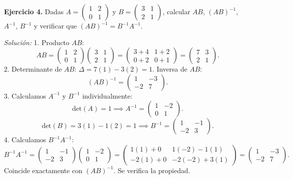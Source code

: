 \documentclass[11pt,letterpaper]{article}
\theoremstyle{definition}
\theoremstyle{plain}
\begin{document}
\vspace{0.3cm}
\textbf{Ejercicio 4.} Dadas $A = \begin{pmatrix} 1 & 2 \\ 0 & 1 \end{pmatrix}$ y $B = \begin{pmatrix} 3 & 1 \\ 2 & 1 \end{pmatrix}$, calcular $AB$, $(AB)^{-1}$, $A^{-1}$, $B^{-1}$ y verificar que $(AB)^{-1} = B^{-1} A^{-1}$.

\emph{Solución:}
1. Producto $AB$:
\[
AB = \begin{pmatrix} 1 & 2 \\ 0 & 1 \end{pmatrix} \begin{pmatrix} 3 & 1 \\ 2 & 1 \end{pmatrix} = \begin{pmatrix} 3+4 & 1+2 \\ 0+2 & 0+1 \end{pmatrix} = \begin{pmatrix} 7 & 3 \\ 2 & 1 \end{pmatrix}.
\]
2. Determinante de $AB$: $\Delta = 7(1) - 3(2) = 1$. Inversa de $AB$:
\[
(AB)^{-1} = \begin{pmatrix} 1 & -3 \\ -2 & 7 \end{pmatrix}.
\]
3. Calculamos $A^{-1}$ y $B^{-1}$ individualmente:
\[
\text{det}(A) = 1 \implies A^{-1} = \begin{pmatrix} 1 & -2 \\ 0 & 1 \end{pmatrix}.
\]
\[
\text{det}(B) = 3(1) - 1(2) = 1 \implies B^{-1} = \begin{pmatrix} 1 & -1 \\ -2 & 3 \end{pmatrix}.
\]
4. Calculamos $B^{-1} A^{-1}$:
\[
B^{-1} A^{-1} = \begin{pmatrix} 1 & -1 \\ -2 & 3 \end{pmatrix} \begin{pmatrix} 1 & -2 \\ 0 & 1 \end{pmatrix} = \begin{pmatrix} 1(1)+0 & 1(-2)-1(1) \\ -2(1)+0 & -2(-2)+3(1) \end{pmatrix} = \begin{pmatrix} 1 & -3 \\ -2 & 7 \end{pmatrix}.
\]
Coincide exactamente con $(AB)^{-1}$. Se verifica la propiedad.
\end{document}

